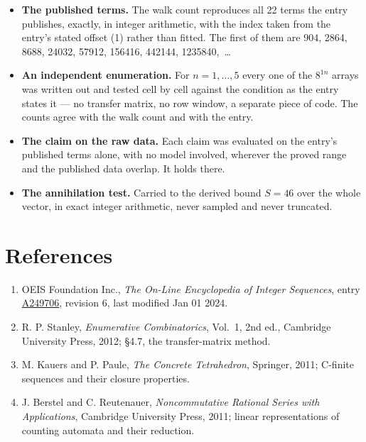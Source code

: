 \documentclass[11pt]{article}
\theoremstyle{definition}
\begin{document}
\begin{itemize}

\item {\bfseries The published terms.} The walk count reproduces all 22 terms the entry publishes, exactly, in integer arithmetic, with the index taken from the entry's stated offset (1) rather than fitted. The first of them are 904, 2864, 8688, 24032, 57912, 156416, 442144, 1235840,~\dots

\item {\bfseries An independent enumeration.} For $n = 1,\dots,5$ every one of the $8^{1n}$ arrays was written out and tested cell by cell against the condition as the entry states it --- no transfer matrix, no row window, a separate piece of code. The counts agree with the walk count and with the entry.

\item {\bfseries The claim on the raw data.} Each claim was evaluated on the entry's published terms alone, with no model involved, wherever the proved range and the published data overlap. It holds there.

\item {\bfseries The annihilation test.} Carried to the derived bound $S = 46$ over the whole vector, in exact integer arithmetic, never sampled and never truncated.

\end{itemize}

\section{References}

\begin{enumerate}

\item OEIS Foundation Inc., \emph{The On-Line Encyclopedia of Integer Sequences}, entry \href{https://oeis.org/A249706}{A249706}, revision 6, last modified Jan 01 2024.

\item R. P. Stanley, \emph{Enumerative Combinatorics}, Vol.~1, 2nd ed., Cambridge University Press, 2012; \S4.7, the transfer-matrix method.

\item M. Kauers and P. Paule, \emph{The Concrete Tetrahedron}, Springer, 2011; C-finite sequences and their closure properties.

\item J. Berstel and C. Reutenauer, \emph{Noncommutative Rational Series with Applications}, Cambridge University Press, 2011; linear representations of counting automata and their reduction.

\end{enumerate}
\end{document}

